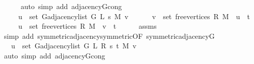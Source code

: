 \begin{isabellebody}
\ \ \ \ \isamarkupfalse%
\ {\isacharparenleft}{\kern0pt}auto\ simp\ add{\isacharcolon}{\kern0pt}\ adjacency{\isacharunderscore}{\kern0pt}G{}{\isacharunderscore}{\kern0pt}{}{\isacharunderscore}{\kern0pt}cong{\isacharparenright}{\kern0pt}\isanewline
\ \ \isamarkupfalse%
\ \isamarkupfalse%
\isanewline
\ \ \ \ {\isachardoublequoteopen}{\isachardot}{\kern0pt}{\isachardot}{\kern0pt}{\isachardot}{\kern0pt}\ {\isasymlongleftrightarrow}\isanewline
\ \ \ \ \ u\ {\isasymin}\ set\ {\isacharparenleft}{\kern0pt}G{\isachardot}{\kern0pt}adjacency{\isacharunderscore}{\kern0pt}list\ {\isacharparenleft}{\kern0pt}G{}{\isacharunderscore}{\kern0pt}{}\ L\ s\ M{\isacharparenright}{\kern0pt}\ v{\isacharparenright}{\kern0pt}\ {\isasymor}\isanewline
\ \ \ \ \ {\isacharparenleft}{\kern0pt}v\ {\isasymin}\ set\ {\isacharparenleft}{\kern0pt}free{\isacharunderscore}{\kern0pt}vertices\ R\ M{\isacharparenright}{\kern0pt}\ {\isasymand}\ u\ {\isacharequal}{\kern0pt}\ t{\isacharparenright}{\kern0pt}\ {\isasymor}\isanewline
\ \ \ \ \ {\isacharparenleft}{\kern0pt}u\ {\isasymin}\ set\ {\isacharparenleft}{\kern0pt}free{\isacharunderscore}{\kern0pt}vertices\ R\ M{\isacharparenright}{\kern0pt}\ {\isasymand}\ v\ {\isacharequal}{\kern0pt}\ t{\isacharparenright}{\kern0pt}{\isachardoublequoteclose}\isanewline
\ \ \ \ \isamarkupfalse%
\ assms\isanewline
\ \ \ \ \isamarkupfalse%
\ {\isacharparenleft}{\kern0pt}simp\ add{\isacharcolon}{\kern0pt}\ symmetric{\isacharunderscore}{\kern0pt}adjacency{\isachardot}{\kern0pt}symmetric{\isacharbrackleft}{\kern0pt}OF\ symmetric{\isacharunderscore}{\kern0pt}adjacency{\isacharunderscore}{\kern0pt}G{}{\isacharunderscore}{\kern0pt}{}{\isacharbrackright}{\kern0pt}{\isacharparenright}{\kern0pt}\isanewline
\ \ \isamarkupfalse%
\ \isamarkupfalse%
\ {\isachardoublequoteopen}{\isachardot}{\kern0pt}{\isachardot}{\kern0pt}{\isachardot}{\kern0pt}\ {\isasymlongleftrightarrow}\ u\ {\isasymin}\ set\ {\isacharparenleft}{\kern0pt}G{\isachardot}{\kern0pt}adjacency{\isacharunderscore}{\kern0pt}list\ {\isacharparenleft}{\kern0pt}G{}{\isacharunderscore}{\kern0pt}{}\ L\ R\ s\ t\ M{\isacharparenright}{\kern0pt}\ v{\isacharparenright}{\kern0pt}{\isachardoublequoteclose}\isanewline
\ \ \ \ \isamarkupfalse%
\ {\isacharparenleft}{\kern0pt}auto\ simp\ add{\isacharcolon}{\kern0pt}\ adjacency{\isacharunderscore}{\kern0pt}G{}{\isacharunderscore}{\kern0pt}{}{\isacharunderscore}{\kern0pt}cong{\isacharparenright}{\kern0pt}\isanewline

\end{isabellebody}
